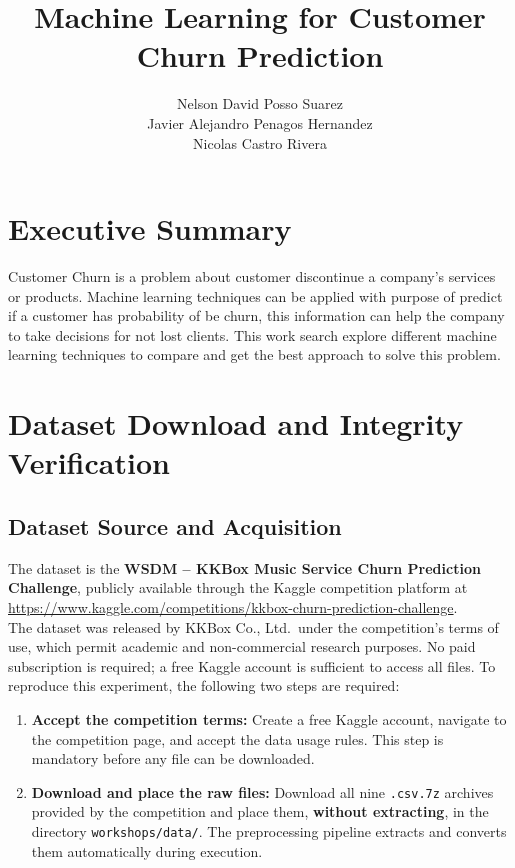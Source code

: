 \documentclass{article}
\title{ Machine Learning for Customer Churn Prediction}
\author{Nelson David Posso Suarez \\ Javier Alejandro Penagos Hernandez \\ Nicolas Castro Rivera }
\date{}
\begin{document}
\maketitle


\section{Executive Summary}
Customer Churn is a problem about customer discontinue a company's services or products. Machine learning techniques can be applied with purpose of predict if a customer
has probability of be churn, this information can help the company to take decisions for not lost clients. This work search explore different machine learning techniques
to compare and get the best approach to solve this problem.


\section{Dataset Download and Integrity Verification}

\subsection{Dataset Source and Acquisition}

The dataset is the  \textbf{WSDM -- KKBox Music Service Churn Prediction Challenge},
publicly available through the Kaggle competition platform at
\\ \url{https://www.kaggle.com/competitions/kkbox-churn-prediction-challenge}.
\\ The dataset was released by KKBox Co., Ltd.\ under the competition's terms of use, which permit academic and non-commercial research purposes. No paid subscription is required; a free Kaggle account is sufficient to access all files.
To reproduce this experiment, the following two steps are required:

\begin{enumerate}
    \item \textbf{Accept the competition terms:} Create a free Kaggle account, navigate to the competition page, and accept the data usage rules. This step is mandatory before any file can be downloaded.

    \item \textbf{Download and place the raw files:} Download all nine \texttt{.csv.7z} archives provided by the competition and place them, \textbf{without extracting}, in the directory \texttt{workshops/data/}. The preprocessing pipeline extracts and converts them automatically during execution.
\end{enumerate}
\end{document}

